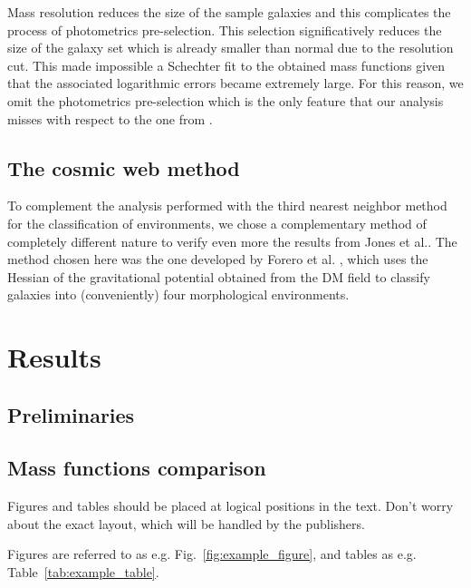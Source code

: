 \documentclass[a4paper,fleqn,usenatbib]{mnras}
\begin{document}
Mass resolution reduces the size of the sample galaxies and this
complicates the process of photometrics pre-selection. This selection
significatively reduces the size of the galaxy set which is already
smaller than normal due to the resolution cut. This made impossible a
Schechter fit to the obtained mass functions given that the associated
logarithmic errors became extremely large. For this reason, we omit
the photometrics pre-selection which is the only feature that our
analysis misses with respect to the one from \cite{jones1}.\\ 

\subsection{The cosmic web method}
To complement the analysis performed with the third nearest neighbor
method for the classification of environments, we chose a
complementary method of completely different nature to verify even
more the results from Jones et al.. The method chosen here was the one
developed by Forero et al. \cite{forero1}, which uses the Hessian of
the gravitational potential obtained from the DM field to classify
galaxies into (conveniently) four morphological environments.\\  

\section{Results}
\subsection{Preliminaries}

\subsection{Mass functions comparison}

Figures and tables should be placed at logical positions in the text. Don't
worry about the exact layout, which will be handled by the publishers.

Figures are referred to as e.g. Fig.~\ref{fig:example_figure}, and tables as
e.g. Table~\ref{tab:example_table}.
\end{document}
